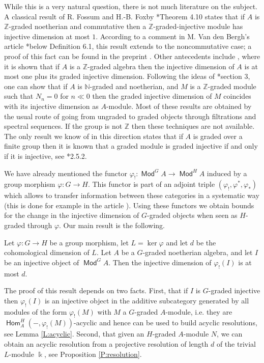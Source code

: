 \documentclass[11pt,fleqn]{article}
\newcommand\NN{\mathbb N}
\newcommand\ZZ{\mathbb Z}
\renewcommand\to{\longrightarrow}
\renewcommand\phi{\varphi}
\renewcommand\k{\Bbbk}
\DeclareMathOperator\Mod{\mathsf{Mod}}
\DeclareMathOperator\Hom{\mathsf{Hom}}
\begin{document}
While this is a very natural question, there is not much literature on the
subject. A classical result of R. Fossum and H.-B. Foxby 
\cite{FF-graded}*{Theorem 4.10} states that if $A$ is $\ZZ$-graded noetherian 
and commutative then a $\ZZ$-graded-injective module has injective dimension 
at most $1$. According to a comment in M. Van den Bergh's article 
\cite{VdB-existence-dc}*{below Definition 6.1}, this result extends to the 
noncommutative case; a proof of this fact can be found in the preprint
\cite{Yek-note}. Other antecedents include \cite{Eks-auslander}, where it is 
shown that if $A$ is a $\ZZ$-graded algebra then the injective dimension of $A$
is at most one plus its graded injective dimension. Following the ideas of 
\cite{Lev-ncreg}*{section 3}, one can show that if $A$ is $\NN$-graded and 
noetherian, and $M$ is a $\ZZ$-graded module such that $N_n = 0$ for $n \ll 0$ 
then the graded injective dimension of $M$ coincides with its injective 
dimension as $A$-module. Most of these results are obtained by the usual route 
of going from ungraded to graded objects through filtrations and spectral 
sequences. If the group is not $\ZZ$ then these techniques are not available. 
The only result we know of in this direction states that if $A$ is graded over 
a finite group then it is known that a graded module is graded injective if 
and only if it is injective, see 
\cite{NV-graded-book3}*{2.5.2}.

We have already mentioned the functor $\phi_!: \Mod^G A \to \Mod^H A$ induced
by a group morphism $\phi: G \to H$. This functor is part of an adjoint triple
$(\phi_!, \phi^*, \phi_*)$ which allows to transfer information between these 
categories in a systematic way (this is done for example in the article 
\cite{RZ-twisted}). Using these functors we obtain bounds for the
change in the injective dimension of $G$-graded objects when seen as 
$H$-graded through $\phi$. Our main result is the following.
\begin{Theorem*}
Let $\phi: G \to H$ be a group morphism, let $L = \ker \phi$ and let $d$ be 
the cohomological dimension of $L$. Let $A$ be a $G$-graded noetherian 
algebra, and let $I$ be an injective object of $\Mod^G A$. Then the injective
dimension of $\phi_!(I)$ is at most $d$. 
\end{Theorem*}
The proof of this result depends on two facts. First, that if $I$ is 
$G$-graded injective then $\phi_!(I)$ is an injective object in the additive 
subcategory generated by all modules of the form $\phi_!(M)$ with $M$ a 
$G$-graded $A$-module, i.e. they are $\Hom_A^H(-,\phi_!(M))$-acyclic and hence 
can be used to build acyclic resolutions, see Lemma  
\ref{L:acyclic}. Second, that given an $H$-graded $A$-module $N$, we can 
obtain an acyclic resolution from a projective resolution of length $d$ of the 
trivial $L$-module $\k$, see Proposition \ref{P:resolution}.  
\end{document}
